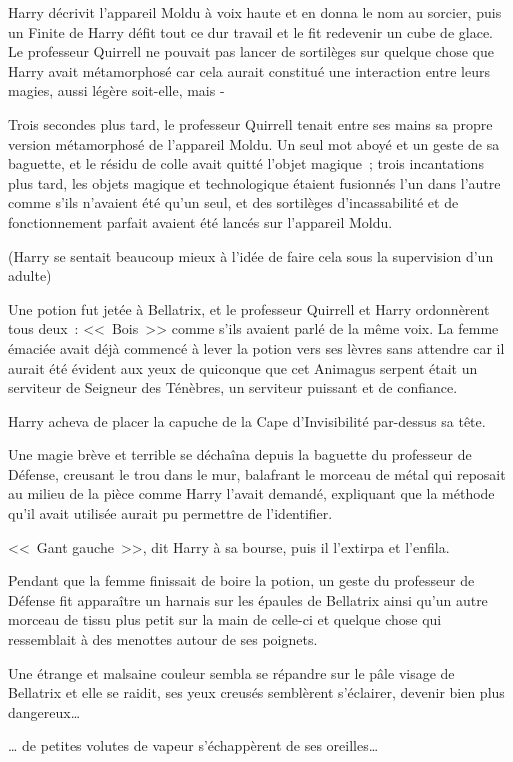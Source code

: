 Harry décrivit l'appareil Moldu à voix haute et en donna le nom au sorcier, puis un Finite de Harry défit tout ce dur travail et le fit redevenir un cube de glace. Le professeur Quirrell ne pouvait pas lancer de sortilèges sur quelque chose que Harry avait métamorphosé car cela aurait constitué une interaction entre leurs magies, aussi légère soit-elle, mais -

Trois secondes plus tard, le professeur Quirrell tenait entre ses mains sa propre version métamorphosé de l'appareil Moldu. Un seul mot aboyé et un geste de sa baguette, et le résidu de colle avait quitté l'objet magique~; trois incantations plus tard, les objets magique et technologique étaient fusionnés l'un dans l'autre comme s'ils n'avaient été qu'un seul, et des sortilèges d'incassabilité et de fonctionnement parfait avaient été lancés sur l'appareil Moldu.

(Harry se sentait beaucoup mieux à l'idée de faire cela sous la supervision d'un adulte)

Une potion fut jetée à Bellatrix, et le professeur Quirrell et Harry ordonnèrent tous deux~: <<~Bois~>> comme s'ils avaient parlé de la même voix. La femme émaciée avait déjà commencé à lever la potion vers ses lèvres sans attendre car il aurait été évident aux yeux de quiconque que cet Animagus serpent était un serviteur de Seigneur des Ténèbres, un serviteur puissant et de confiance.

Harry acheva de placer la capuche de la Cape d'Invisibilité par-dessus sa tête.

Une magie brève et terrible se déchaîna depuis la baguette du professeur de Défense, creusant le trou dans le mur, balafrant le morceau de métal qui reposait au milieu de la pièce comme Harry l'avait demandé, expliquant que la méthode qu'il avait utilisée aurait pu permettre de l'identifier.

<<~Gant gauche~>>, dit Harry à sa bourse, puis il l'extirpa et l'enfila.

Pendant que la femme finissait de boire la potion, un geste du professeur de Défense fit apparaître un harnais sur les épaules de Bellatrix ainsi qu'un autre morceau de tissu plus petit sur la main de celle-ci et quelque chose qui ressemblait à des menottes autour de ses poignets.

Une étrange et malsaine couleur sembla se répandre sur le pâle visage de Bellatrix et elle se raidit, ses yeux creusés semblèrent s'éclairer, devenir bien plus dangereux…

… de petites volutes de vapeur s'échappèrent de ses oreilles…

